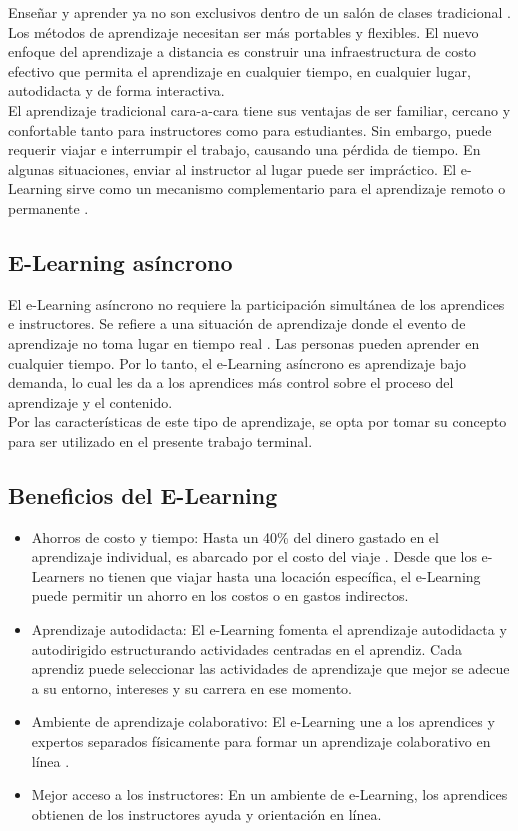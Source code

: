 Enseñar y aprender ya no son exclusivos dentro de un salón de clases tradicional \cite{NC}. Los métodos de aprendizaje necesitan ser más portables y flexibles. El nuevo enfoque del aprendizaje a distancia es construir una infraestructura de costo efectivo que permita el aprendizaje en cualquier tiempo, en cualquier lugar, autodidacta y de forma interactiva.\\

El aprendizaje tradicional cara-a-cara tiene sus ventajas de ser familiar, cercano y confortable tanto para instructores como para estudiantes. Sin embargo, puede requerir viajar e interrumpir el trabajo, causando una pérdida de tiempo. En algunas situaciones, enviar al instructor al lugar puede ser impráctico. El e-Learning sirve como un mecanismo complementario para el aprendizaje remoto o permanente \cite{Zhang}.
\subsection{E-Learning asíncrono}
\label{sec:elearning}
El e-Learning asíncrono no requiere la participación simultánea de los aprendices e instructores. Se refiere a una situación de aprendizaje donde el evento de aprendizaje no toma lugar en tiempo real \cite{Zhang}. Las personas pueden aprender en cualquier tiempo. Por lo tanto, el e-Learning asíncrono es aprendizaje bajo demanda, lo cual les da a los aprendices más control sobre el proceso del aprendizaje y el contenido.\\

Por las características de este tipo de aprendizaje, se opta por tomar su concepto para ser utilizado en el presente trabajo terminal.
\subsection{Beneficios del E-Learning}

\begin{itemize}
\item Ahorros de costo y tiempo: Hasta un 40\% del dinero gastado en el aprendizaje individual, es abarcado por el costo del viaje \cite{Zhang}. Desde que los e-Learners no tienen que viajar hasta una locación específica, el e-Learning puede permitir un ahorro en los costos o en gastos indirectos.
\item Aprendizaje autodidacta: El e-Learning fomenta el aprendizaje autodidacta y autodirigido estructurando actividades centradas en el aprendiz. Cada aprendiz puede seleccionar las actividades de aprendizaje  que mejor se adecue a su entorno, intereses y su carrera en ese momento.
\item Ambiente de aprendizaje colaborativo: El e-Learning une a los aprendices y expertos separados físicamente para formar un aprendizaje colaborativo en línea \cite{Hiltz}.
\item Mejor acceso a los instructores: En un ambiente de e-Learning, los aprendices obtienen de los instructores ayuda y orientación en línea.
\end{itemize}

\clearpage
